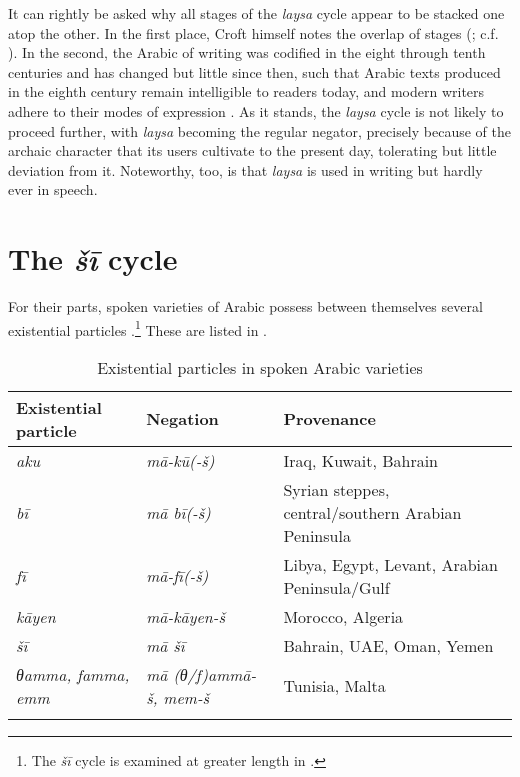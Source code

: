 \documentclass[output=paper,colorlinks,citecolor=brown]{langscibook}
\begin{document}
It can rightly be asked why all stages of the \textit{laysa} cycle appear to be stacked one atop the other. In the first place, Croft himself notes the overlap of stages (\citeyear[22]{Croft1991}; c.f. \citealp[146, 149, 151--154]{Veselinova2016}). In the second, the Arabic of writing was codified in the eight through tenth centuries and has changed but little since then, such that Arabic texts produced in the eighth century remain intelligible to readers today, and modern writers adhere to their modes of expression \citep[340]{wilmsen2016a}. As it stands, the \textit{laysa} cycle is not likely to proceed further, with \textit{laysa} becoming the regular negator, precisely because of the archaic character that its users cultivate to the present day, tolerating but little deviation from it. Noteworthy, too, is that \textit{laysa} is used in writing but hardly ever in speech.

\section{The \textit{šī} cycle}\label{s:WiAR-3}
\largerpage
For their parts, spoken varieties of Arabic possess between themselves several existential particles \citep{eid2008a}.\footnote{The \textit{šī} cycle is examined at greater length in \citet{wilmsen2020a}.} These are listed in .

\begin{table}
	\caption{Existential particles in spoken Arabic varieties}
	\label{tab:WiAR-1}
\begin{tabularx}{\textwidth}{llQ}
\lsptoprule
{Existential particle} & {Negation} & {Provenance} \\ \midrule
\textit{aku} & \textit{mā-kū(-š)} & Iraq, Kuwait, Bahrain \\
\textit{bī} & \textit{mā bī(-š)} & Syrian steppes, central/southern Arabian Peninsula \\
\textit{fī} & \textit{mā-fī(-š)} & Libya, Egypt, Levant, Arabian Peninsula/Gulf \\
\textit{kāyen} & \textit{mā-kāyen-š} & Morocco, Algeria \\
\textit{šī} & \textit{mā šī} & Bahrain, UAE, Oman, Yemen \\
\textit{θamma, famma, emm} & \textit{mā (θ/f)ammā-š, mem-š} & Tunisia, Malta \\ \lspbottomrule   
\end{tabularx}
\end{table}
\end{document}
